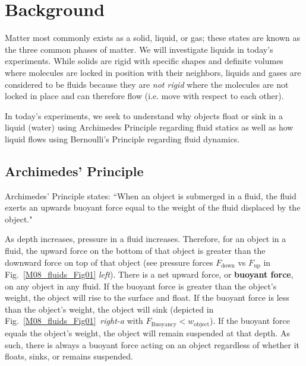 
{}
\label{lab:M08_Fluids}


\section{Background}

Matter most commonly exists as a solid, liquid, or gas; these states are known as the three common phases of matter. We will investigate liquids in today's experiments. While solids are rigid with specific shapes and definite volumes where molecules are locked in position with their neighbors, liquids and gases are considered to be fluids because they are \textit{not rigid} where the molecules are not locked in place and can therefore flow (i.e. move with respect to each other). 


In today's experiments, we seek to understand why objects float or sink in a liquid (water) using Archimedes Principle regarding fluid statics as well as how liquid flows using Bernoulli's Principle regarding fluid dynamics.


\subsection{Archimedes' Principle}

Archimedes' Principle states: ``When an object is submerged in a fluid, the fluid exerts an upwards buoyant force equal to the weight of the fluid displaced by the object."


As depth increases, pressure in a fluid increases. Therefore, for an object in a fluid, the upward force on the bottom of that object is greater than the downward force on top of that object (see pressure forces $F_{\text{down}}$ vs $F_{\text{up}}$ in Fig.~\ref{M08_fluids_Fig01} \textit{left}). There is a net upward force, or \textbf{buoyant force}, on any object in any fluid. If the buoyant force is greater than the object’s weight, the object will rise to the surface and float. If the buoyant force is less than the object’s weight, the object will sink (depicted in Fig.~\ref{M08_fluids_Fig01}~\textit{right-a} with $F_\text{Buoyancy} < w_\text{object}$). If the buoyant force equals the object’s weight, the object will remain suspended at that depth. As such, there is always a buoyant force acting on an object regardless of whether it floats, sinks, or remains suspended.

